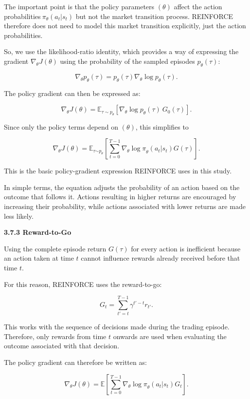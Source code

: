 The important point is that the policy parameters \((\theta)\) affect
the action probabilities\(\ \pi_{\theta}\left( a_{t}|s_{t} \right)\) but
not the market transition process. REINFORCE therefore does not need to
model this market transition explicitly, just the action probabilities.

So, we use the likelihood-ratio identity, which provides a way of
expressing the gradient \(\nabla_{\theta}J(\theta)\) using the
probability of the sampled episodes \(p_{\theta}(\tau)\):

\[\nabla_{\theta}p_{\theta}(\tau) = p_{\theta}(\tau)\nabla_{\theta}{\log p}_{\theta}(\tau).\]

The policy gradient can then be expressed as:

\[\nabla_{\theta}J(\theta) = \mathbb{E}_{\tau\sim p_{\theta}}\left\lbrack \nabla_{\theta}{\log p}_{\theta}(\tau){\ G}_{0}(\tau) \right\rbrack.\]

Since only the policy terms depend on \((\theta)\), this simplifies to

\[\nabla_{\theta}J(\theta) = \mathbb{E}_{\tau{\sim p}_{\theta}}\left\lbrack \sum_{t = 0}^{T - 1}\nabla_{\theta}{\log\pi}_{\theta}\left( a_{t}|s_{t} \right)G(\tau) \right\rbrack.\]

This is the basic policy-gradient expression REINFORCE uses in this
study.

In simple terms, the equation adjusts the probability of an action based
on the outcome that follows it. Actions resulting in higher returns are
encouraged by increasing their probability, while actions associated
with lower returns are made less likely.

\textbf{3.7.3 Reward-to-Go}

Using the complete episode return \(G(\tau)\) for every action is
inefficient because an action taken at time \(t\) cannot influence
rewards already received before that time \(t\).

For this reason, REINFORCE uses the reward-to-go:

\[G_{t} = \sum_{t' = t}^{T - 1}\gamma^{t' - t}r_{t'}.\]

This works with the sequence of decisions made during the trading
episode. Therefore, only rewards from time \(t\) onwards are used when
evaluating the outcome associated with that decision.

The policy gradient can therefore be written as:

\[\nabla_{\theta}J(\theta) = \mathbb{E}\left\lbrack \sum_{t = 0}^{T - 1}\nabla_{\theta}{\log\pi}_{\theta}\left( a_{t}|s_{t} \right)G_{t} \right\rbrack.\]

